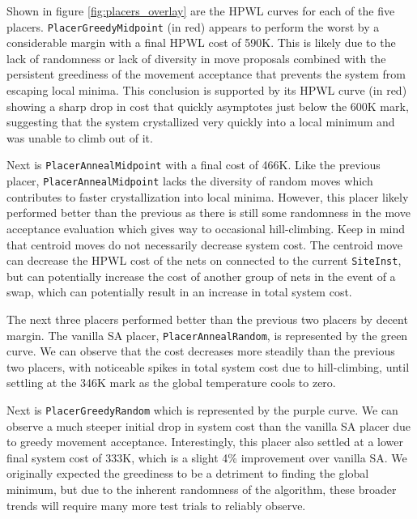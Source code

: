 Shown in figure \ref{fig:placers_overlay} are the HPWL curves for each of the five placers. 
\texttt{PlacerGreedyMidpoint} (in red) appears to perform the worst by a considerable margin with a final HPWL cost of 590K.
This is likely due to the lack of randomness or lack of diversity in move proposals combined with the persistent greediness of the movement acceptance that prevents the system from escaping local minima.
This conclusion is supported by its HPWL curve (in red) showing a sharp drop in cost that quickly asymptotes just below the 600K mark, suggesting that the system crystallized very quickly into a local minimum and was unable to climb out of it.

Next is \texttt{PlacerAnnealMidpoint} with a final cost of 466K.
Like the previous placer, \texttt{PlacerAnnealMidpoint} lacks the diversity of random moves which contributes to faster crystallization into local minima.
However, this placer likely performed better than the previous as there is still some randomness in the move acceptance evaluation which gives way to occasional hill-climbing. 
Keep in mind that centroid moves do not necessarily decrease system cost. 
The centroid move can decrease the HPWL cost of the nets on connected to the current \texttt{SiteInst}, but can potentially increase the cost of another group of nets in the event of a swap, which can potentially result in an increase in total system cost.

The next three placers performed better than the previous two placers by decent margin.
The vanilla SA placer, \texttt{PlacerAnnealRandom}, is represented by the green curve.
We can observe that the cost decreases more steadily than the previous two placers, with noticeable spikes in total system cost due to hill-climbing, until settling at the 346K mark as the global temperature cools to zero.

Next is \texttt{PlacerGreedyRandom} which is represented by the purple curve.
We can observe a much steeper initial drop in system cost than the vanilla SA placer due to greedy movement acceptance.
Interestingly, this placer also settled at a lower final system cost of 333K, which is a slight 4\% improvement over vanilla SA.
We originally expected the greediness to be a detriment to finding the global minimum, but due to the inherent randomness of the algorithm, these broader trends will require many more test trials to reliably observe.


